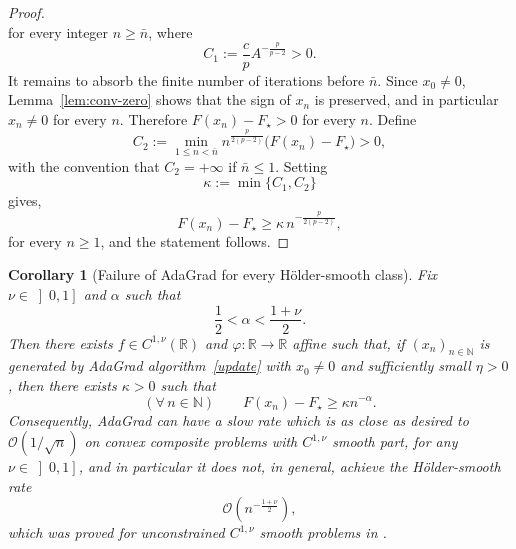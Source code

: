 \documentclass[11pt]{article}
\newtheorem{corollary}{Corollary}
\newcommand{\R}{\mathbb{R}}
\newcommand{\N}{\mathbb{N}}
\begin{document}
\begin{proof}
\[\]
for every integer $n\geq \bar{n}$, where
\[
    C_1
    :=
    \frac{c}{p}A^{-\frac{p}{p-2}}>0.
\]
It remains to absorb the finite number of iterations before $\bar{n}$. Since \(x_0\neq0\), Lemma~\ref{lem:conv-zero} shows that the sign of \(x_n\) is preserved, and in particular \(x_n\neq0\) for every \(n\). Therefore \(F(x_n)-F_\star>0\) for every \(n\). Define
\[
    C_2
    :=
    \min_{1\le n<\bar{n}}
    n^{\frac{p}{2(p-2)}}
    \bigl(F(x_n)-F_\star\bigr) > 0,
\]
with the convention that \(C_2=+\infty\) if \(\bar{n}\le1\). Setting
\[
    \kappa:=\min\{C_1,C_2\}
\]
gives, 
\begin{equation*}
    F(x_n)-F_\star
    \ge
    \kappa\,
    n^{-\frac{p}{2(p-2)}},
\end{equation*}
for every \(n\ge1\), and the statement follows.
\end{proof}

\begin{corollary}[Failure of AdaGrad for every H\"older-smooth class]
\label{thm:main}
Fix $\nu\in \left]0,1\right]$ and $\alpha$
such that
\begin{equation*}
\frac 1 2 < \alpha<\frac{1+\nu}{2}.
\end{equation*}
Then there exists $f \in C^{1,\nu}(\R)$ and $\varphi\colon \R\to \R$ affine such that,
if $(x_n)_{n\in \N}$ is generated by AdaGrad algorithm~\eqref{update} with $x_0\neq 0$ and sufficiently small $\eta>0$,
then there exists $\kappa>0$ such that
\begin{equation*}
(\forall\,n\in \N)\qquad 
F(x_n)-F_\star
    \geq
    \kappa n^{-\alpha}.
\end{equation*} 
Consequently, AdaGrad can have a slow rate which is as close as desired to $ \mathcal O(1/\sqrt{n})$ on convex composite problems with \(C^{1,\nu}\) smooth part, for any $\nu\in \left]0,1\right]$, and in particular it does not, in general, achieve the H\"older-smooth rate
\begin{equation*}
    \mathcal O\left(n^{-\frac{1+\nu}{2}}\right),
\end{equation*}
which was proved for unconstrained \(C^{1,\nu}\) smooth problems in \citep{orabona2023normalized}.
\end{corollary}
\end{document}
